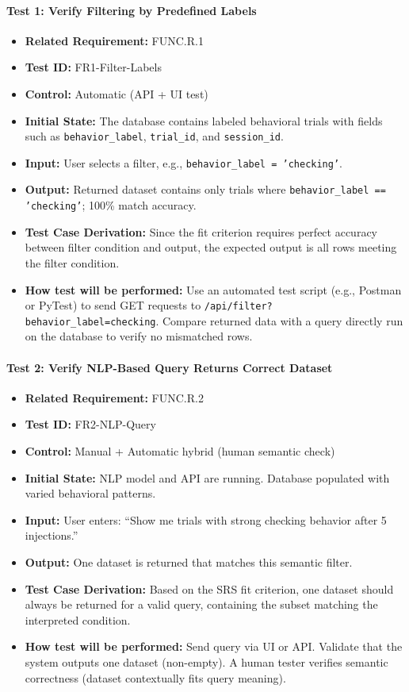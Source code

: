 \documentclass[12pt, titlepage]{article}
\begin{document}
\paragraph{Test 1: Verify Filtering by Predefined Labels}
\begin{itemize}
    \item \textbf{Related Requirement:} FUNC.R.1
    \item \textbf{Test ID:} FR1-Filter-Labels
    \item \textbf{Control:} Automatic (API + UI test)
    \item \textbf{Initial State:} The database contains labeled behavioral trials with fields such as \texttt{behavior\_label}, \texttt{trial\_id}, and \texttt{session\_id}.
    \item \textbf{Input:} User selects a filter, e.g., \texttt{behavior\_label = 'checking'}.
    \item \textbf{Output:} Returned dataset contains only trials where \texttt{behavior\_label == 'checking'}; 100\% match accuracy.
    \item \textbf{Test Case Derivation:} Since the fit criterion requires perfect accuracy between filter condition and output, the expected output is all rows meeting the filter condition.
    \item \textbf{How test will be performed:} Use an automated test script (e.g., Postman or PyTest) to send GET requests to \texttt{/api/filter?behavior\_label=checking}. Compare returned data with a query directly run on the database to verify no mismatched rows.
\end{itemize}

\paragraph{Test 2: Verify NLP-Based Query Returns Correct Dataset}
\begin{itemize}
    \item \textbf{Related Requirement:} FUNC.R.2
    \item \textbf{Test ID:} FR2-NLP-Query
    \item \textbf{Control:} Manual + Automatic hybrid (human semantic check)
    \item \textbf{Initial State:} NLP model and API are running. Database populated with varied behavioral patterns.
    \item \textbf{Input:} User enters: ``Show me trials with strong checking behavior after 5 injections.''
    \item \textbf{Output:} One dataset is returned that matches this semantic filter.
    \item \textbf{Test Case Derivation:} Based on the SRS fit criterion, one dataset should always be returned for a valid query, containing the subset matching the interpreted condition.
    \item \textbf{How test will be performed:} Send query via UI or API. Validate that the system outputs one dataset (non-empty). A human tester verifies semantic correctness (dataset contextually fits query meaning).
\end{itemize}
\end{document}

